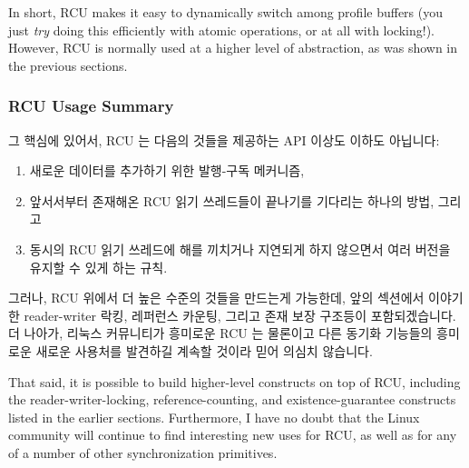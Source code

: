 In short, RCU makes it easy to dynamically switch among profile
buffers (you just \emph{try} doing this efficiently with atomic
operations, or at all with locking!).
However, RCU is normally used at a higher level of abstraction, as
was shown in the previous sections.

\fi

\subsubsection{RCU Usage Summary}
\label{sec:defer:RCU Usage Summary}

그 핵심에 있어서, RCU 는 다음의 것들을 제공하는 API 이상도 이하도 아닙니다:

\begin{enumerate}
\item	새로운 데이터를 추가하기 위한 발행-구독 메커니즘,
\item	앞서서부터 존재해온 RCU 읽기 쓰레드들이 끝나기를 기다리는 하나의 방법,
	그리고
\item	동시의 RCU 읽기 쓰레드에 해를 끼치거나 지연되게 하지 않으면서 여러
	버전을 유지할 수 있게 하는 규칙.

\end{enumerate}

그러나, RCU 위에서 더 높은 수준의 것들을 만드는게 가능한데, 앞의 섹션에서
이야기한 reader-writer 락킹, 레퍼런스 카운팅, 그리고 존재 보장 구조등이
포함되겠습니다.
더 나아가, 리눅스 커뮤니티가 흥미로운 RCU 는 물론이고 다른 동기화 기능들의
흥미로운 새로운 사용처를 발견하길 계속할 것이라 믿어 의심치 않습니다.

\iffalse

That said, it is possible to build higher-level constructs
on top of RCU, including the reader-writer-locking, reference-counting,
and existence-guarantee constructs listed in the earlier sections.
Furthermore, I have no doubt that the Linux community will continue to
find interesting new uses for RCU,
as well as for any of a number of other synchronization primitives.

